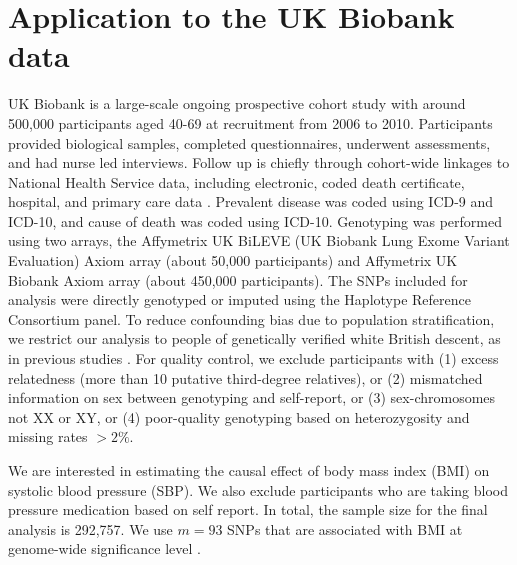 \documentclass[12pt]{article}
\begin{document}
{\vspace{-5mm}
\section{Application to the UK Biobank data}
\label{sec: real}

UK Biobank is a large-scale ongoing prospective cohort study with around 500,000 participants aged 40-69 at recruitment from 2006 to 2010. Participants provided biological samples, completed questionnaires, underwent assessments, and had nurse led interviews. Follow up is chiefly through cohort-wide linkages to National Health Service data, including electronic, coded death certificate, hospital, and primary care data \citep{sudlow2015uk}. Prevalent disease was coded using ICD-9 and ICD-10, and cause of death was coded using ICD-10. Genotyping was performed using two arrays, the Affymetrix UK BiLEVE (UK Biobank Lung Exome Variant Evaluation) Axiom array (about 50,000 participants) and Affymetrix UK Biobank Axiom array (about 450,000 participants). The SNPs included for analysis were directly genotyped or imputed using the Haplotype Reference Consortium panel. To reduce confounding bias due to population stratification, we restrict our analysis to people of genetically verified white British descent, as in previous studies \citep{Tyrrell2016}. For quality control, we exclude participants with (1) excess relatedness (more than 10 putative third-degree relatives), or (2) mismatched information on sex between genotyping and self-report, or (3) sex-chromosomes not XX or XY, or (4) poor-quality genotyping based on heterozygosity and missing rates $> 2\%$.

We are interested in estimating the causal effect of body mass index (BMI) on systolic blood pressure (SBP). We also exclude participants who are taking blood pressure medication based on self report. In total, the sample size for the final analysis is 292,757. We use $m=93$ SNPs that are associated with BMI at genome-wide significance level  \citep{Locke:2015aa}. 

}
\end{document}

